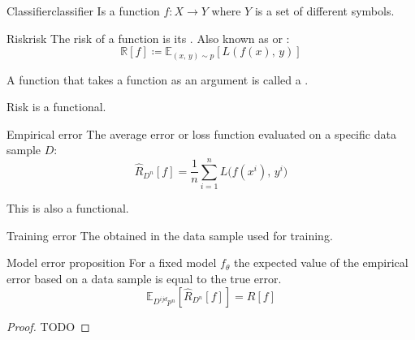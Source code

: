 \begin{definition}{Classifier}{classifier}
	Is a function \(f: X \longrightarrow Y\)
	where \(Y\) is a set of different symbols.
\end{definition}

\begin{definition}{Risk}{risk}
	The risk of a function is its . Also known as
	 or :
	\begin{equation*}
		\mathds{R}[f] \coloneqq \mathds{E}_{(x,\, y) \sim p} \left[ L(f(x),\, y) \right]
	\end{equation*}

	\tcblower{}
	\begin{marker}
		A function that takes a function as an argument is called a .

		Risk is a functional.
	\end{marker}
\end{definition}

\begin{definition}{Empirical error}{}
	The average error or loss function evaluated on a specific data sample
	\(D\):
	\begin{equation*}
		\widehat{R}_{D^n}[f] = \frac{1}{n} \sum_{i=1}^n L\bigl(f(x^i),\, y^i\bigr)
	\end{equation*}

	\tcblower{}
	\begin{note}
		This is also a functional.
	\end{note}
\end{definition}

\begin{definition}{Training error}{}
	The  obtained in the data
	sample used for training.
\end{definition}

\begin{prop}{Model error proposition}{}
	For a fixed model \(f_\theta\) the expected value of the
	empirical error based on a data sample is equal to the true error.
	\begin{equation*}
		\mathds{E}_{D^{ijd}p^n}\left[\widehat{R}_{D^n}[f]\right] = R[f]
	\end{equation*}

	\tcblower
	\begin{proof} TODO
	\end{proof}
\end{prop}


